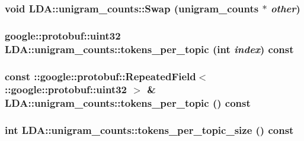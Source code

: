 \label{class_l_d_a_1_1unigram__counts_a7de5819de5f7c49f3cf6ac62088f7cec}
\hypertarget{class_l_d_a_1_1unigram__counts_a0d74c455130e7e494773d4767ef86886}{
\subsubsection[{Swap}]{\setlength{\rightskip}{0pt plus 5cm}void LDA::unigram\_\-counts::Swap ({\bf unigram\_\-counts} $\ast$ {\em other})}}
\label{class_l_d_a_1_1unigram__counts_a0d74c455130e7e494773d4767ef86886}
\hypertarget{class_l_d_a_1_1unigram__counts_a714bd5454edd4f29dba6d01b14ca55e7}{
\subsubsection[{tokens\_\-per\_\-topic}]{\setlength{\rightskip}{0pt plus 5cm}google::protobuf::uint32 LDA::unigram\_\-counts::tokens\_\-per\_\-topic (int {\em index}) const}}
\label{class_l_d_a_1_1unigram__counts_a714bd5454edd4f29dba6d01b14ca55e7}
\hypertarget{class_l_d_a_1_1unigram__counts_abe6999ecd4134cf9e6658ff5f4e3780a}{
\subsubsection[{tokens\_\-per\_\-topic}]{\setlength{\rightskip}{0pt plus 5cm}const ::google::protobuf::RepeatedField$<$::google::protobuf::uint32 $>$ \& LDA::unigram\_\-counts::tokens\_\-per\_\-topic () const}}
\label{class_l_d_a_1_1unigram__counts_abe6999ecd4134cf9e6658ff5f4e3780a}
\hypertarget{class_l_d_a_1_1unigram__counts_ae60abc8497c9e86abd62d51426c1f1a0}{
\subsubsection[{tokens\_\-per\_\-topic\_\-size}]{\setlength{\rightskip}{0pt plus 5cm}int LDA::unigram\_\-counts::tokens\_\-per\_\-topic\_\-size () const}}
